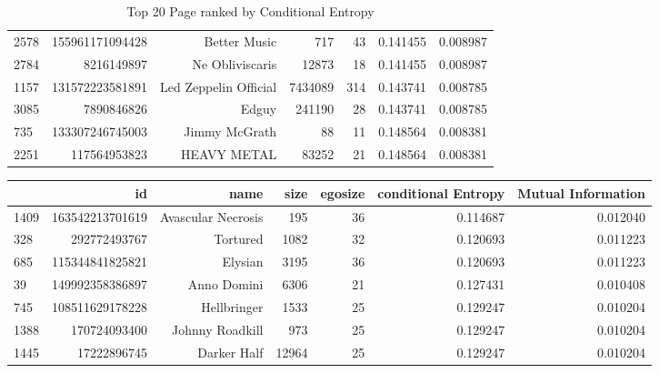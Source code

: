 \documentclass[letterpaper]{article}
\begin{document}
\begin{figure}
\begin{table}
\begin{tabular}{| >{\small}l | >{\small}r | >{\small}r | >{\small}r | >{\small}r | >{\small}r |>{\small}r |}
2578 &  155961171094428 &           Better Music &      717 &       43 &             0.141455 &            0.008987 \\
2784 &       8216149897 &        Ne Obliviscaris &    12873 &       18 &             0.141455 &            0.008987 \\
1157 &  131572223581891 &  Led Zeppelin Official &  7434089 &      314 &             0.143741 &            0.008785 \\
3085 &       7890846826 &                  Edguy &   241190 &       28 &             0.143741 &            0.008785 \\
735  &  133307246745003 &          Jimmy McGrath &       88 &       11 &             0.148564 &            0.008381 \\
2251 &     117564953823 &            HEAVY METAL &    83252 &       21 &             0.148564 &            0.008381 \\
\hline
\end{tabular}
\caption{Top 20 Page ranked by Conditional Entropy}
\label {Top 20 Page ranked by Conditional Entropy}
\end{table}
\cleardoublepage
\begin{table}
\begin{tabular}{| >{\small}l | >{\small}r | >{\small}r | >{\small}r | >{\small}r | >{\small}r |>{\small}r |}
\hline
{} &               id &                      name &    size &  egosize &  conditional Entropy &  Mutual Information \\
\hline
1409 &  163542213701619 &        Avascular Necrosis &     195 &       36 &             0.114687 &            0.012040 \\
328  &     292772493767 &                  Tortured &    1082 &       32 &             0.120693 &            0.011223 \\
685  &  115344841825821 &                   Elysian &    3195 &       36 &             0.120693 &            0.011223 \\
39   &  149992358386897 &               Anno Domini &    6306 &       21 &             0.127431 &            0.010408 \\
745  &  108511629178228 &               Hellbringer &    1533 &       25 &             0.129247 &            0.010204 \\
1388 &     170724093400 &           Johnny Roadkill &     973 &       25 &             0.129247 &            0.010204 \\
1445 &      17222896745 &               Darker Half &   12964 &       25 &             0.129247 &            0.010204 \\

\end{tabular}
\end{table}
\end{figure}
\end{document}

